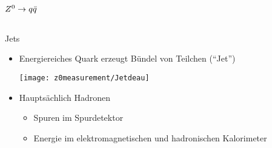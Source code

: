  \begin{frame}
   \frametitle{$Z^{0}\rightarrow q\bar{q}$}
   \pause
   \begin{columns}
     \begin{column}{0.5\textwidth}
       \begin{block}{Jets}
         \begin{itemize}
         \item Energiereiches Quark erzeugt B\"undel von Teilchen
           (``Jet'')
           \begin{center}
             \texttt{[image: z0measurement/Jetdeau]}
           \end{center}
         \item Haupts\"achlich Hadronen
           \begin{itemize}
           \item<3-> Spuren im Spurdetektor
           \item<4-> Energie im elektromagnetischen und hadronischen Kalorimeter
           \end{itemize}
         \end{itemize}
       \end{block}
    \end{column}
     \begin{column}{0.5\textwidth}
    \end{column}
   \end{columns}
 \end{frame}
 
